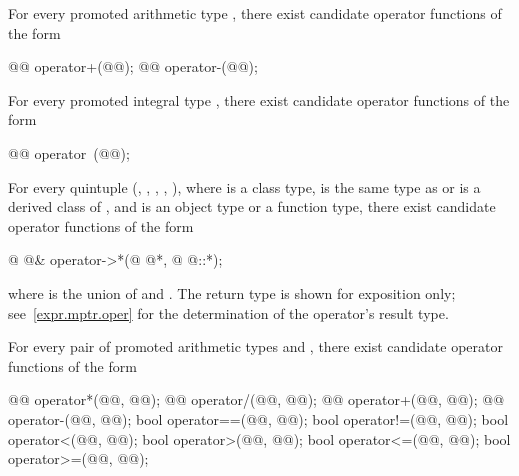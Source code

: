 \pnum
For every promoted arithmetic type
,
there exist candidate operator functions of the form

\begin{codeblock}
@@ operator+(@@);
@@ operator-(@@);
\end{codeblock}

\pnum
For every promoted integral type
,
there exist candidate operator functions of the form

\begin{codeblock}
@@ operator~(@@);
\end{codeblock}

\pnum
For every quintuple
(,
,
,
,
),
where
is a class type,
is the same type as  or is a derived class of , and
is an object type or a function type,
there exist candidate operator functions of the form

\begin{codeblock}
@ @& operator->*(@ @*, @ @::*);
\end{codeblock}

where  is the union of  and .
The return type is shown for exposition only; see~\ref{expr.mptr.oper} for the
determination of the operator's result type.

\pnum
For every pair of promoted arithmetic types
and
,
there exist candidate operator functions of the form

\begin{codeblock}
@@      operator*(@@, @@);
@@      operator/(@@, @@);
@@      operator+(@@, @@);
@@      operator-(@@, @@);
bool    operator==(@@, @@);
bool    operator!=(@@, @@);
bool    operator<(@@, @@);
bool    operator>(@@, @@);
bool    operator<=(@@, @@);
bool    operator>=(@@, @@);
\end{codeblock}


